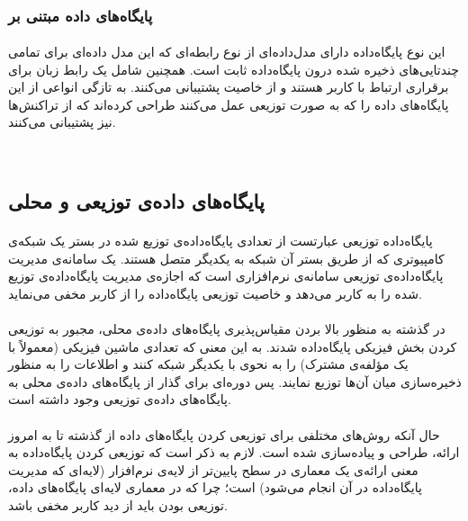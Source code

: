 ‌‌‌‌\subsubsection*{پایگاه‌های داده مبتنی بر
}
\paragraph*{}
این نوع پایگاه‌داده دارای مدل‌داده‌ای از نوع رابطه‌ای
که این مدل داده‌ای برای تمامی چندتایی‌های ذخیره شده درون پایگاه‌داده ثابت است. همچنین شامل یک رابط زبان
برای برقراری ارتباط با کاربر هستند و از خاصیت
پشتیبانی می‌کنند. به تازگی انواعی از این پایگاه‌های داده را که به صورت توزیعی عمل می‌کنند طراحی کرده‌اند که از تراکنش‌ها نیز پشتیبانی می‌کنند.

‌‌‌\subsection{پایگاه‌های داده‌ی توزیعی و محلی} \label{subsection:databases-by-locality}
\paragraph*{}
پایگاه‌داده توزیعی عبارتست از تعدادی پایگاه‌داده‌ی توزیع شده در بستر یک شبکه‌ی کامپیوتری که از طریق بستر آن شبکه به یکدیگر متصل هستند. یک سامانه‌ی مدیریت پایگاه‌داده‌ی توزیعی
سامانه‌ی نرم‌افزاری است که اجازه‌ی مدیریت پایگاه‌داده‌ی توزیع شده را به کاربر می‌دهد و خاصیت توزیعی پایگاه‌داده را از کاربر مخفی می‌نماید.
\cite{ozsu-2011}

\paragraph*{}
در گذشته به منظور بالا بردن مقیاس‌پذیری پایگاه‌های داده‌ی محلی، مجبور به توزیعی کردن بخش فیزیکی پایگاه‌داده شدند. به این معنی که تعدادی ماشین فیزیکی (معمولاً با یک مؤلفه‌ی مشترک) را به نحوی با یکدیگر شبکه کنند و اطلاعات را به منظور ذخیره‌سازی میان آن‌ها توزیع نمایند. پس دوره‌ای برای گذار از پایگاه‌های داده‌ی محلی به پایگاه‌های داده‌ی توزیعی وجود داشته است.
\cite{ozsu-2011}

\paragraph*{}
حال آنکه روش‌های مختلفی برای توزیعی کردن پایگاه‌های داده از گذشته تا به امروز ارائه، طراحی و پیاده‌سازی شده است. لازم به ذکر است که توزیعی کردن پایگاه‌داده به معنی ارائه‌ی یک معماری در سطح پایین‌تر از لایه‌ی نرم‌افزار (لایه‌ای که مدیریت
پایگاه‌داده در آن انجام می‌شود) است؛ چرا که در معماری لایه‌ای پایگاه‌های داده، توزیعی بودن باید از دید کاربر مخفی باشد.
\cite{sword-2014}


